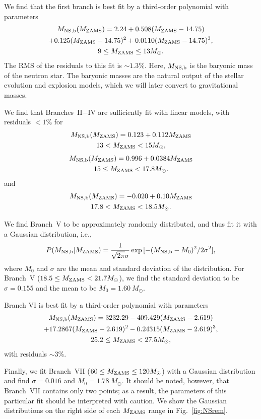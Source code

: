\documentclass[]{emulateapj}
\newcommand{\Ms}{M_{\odot}}
\newcommand{\Mz}{M_{\rm ZAMS}}
\newcommand{\Mnb}{M_{\rm NS, b}}
\begin{document}
We find that the first branch is best fit by a third-order polynomial with parameters
\begin{multline}
\Mnb(\Mz) = 2.24 + 0.508 (\Mz-14.75) \\ + 0.125 (\Mz-14.75)^2 + 0.0110(\Mz-14.75)^3, \\
9 \le \Mz \le 13 \Ms.
\end{multline} 
The RMS of the residuals to this fit is $\sim1.3\%$. Here, $\Mnb$ is the baryonic mass of the neutron star. The baryonic masses are the natural output of the stellar evolution and explosion models, which we will later convert to gravitational masses. 

We find that Branches~II$-$IV are sufficiently fit with linear models, with residuals $<1\%$ for
\begin{multline}
\Mnb(\Mz) = 0.123 + 0.112 \Mz\\
13 < \Mz < 15 \Ms,
\end{multline}
\begin{multline}
\Mnb(\Mz) = 0.996 + 0.0384 \Mz \\
15 \le \Mz < 17.8 \Ms.
\end{multline}
and
\begin{multline}
\Mnb(\Mz) = -0.020 + 0.10 \Mz \\
17.8 < \Mz  <18.5 \Ms.
\end{multline}

We find Branch~V to be approximately randomly distributed, and thus fit it with a Gaussian distribution, i.e.,
\begin{equation}
\label{eq:NSgauss}
P(\Mnb | \Mz) = \frac{1}{\sqrt{2 \pi} \sigma} \exp{[-(\Mnb - M_0)^2 / 2 \sigma^2]},
\end{equation}
where $M_0$ and $\sigma$ are the mean and standard deviation of the distribution.
For Branch~V ($18.5 \le \Mz  < 21.7 \Ms$), we find the standard deviation to be $\sigma = 0.155$ and the mean to be $M_0=1.60~\Ms$.

Branch VI is best fit by a third-order polynomial with parameters 
\begin{multline}
\Mnb(\Mz) = 3232.29 - 409.429(\Mz - 2.619) \\ 
	+ 17.2867 (\Mz-2.619)^2 - 0.24315(\Mz-2.619)^3, \\
25.2 \le \Mz < 27.5 \Ms,
\end{multline}
with residuals $\sim$3\%. 

Finally, we fit Branch~VII ($60 \le \Mz \le 120 \Ms$) with a Gaussian distribution and find $\sigma = 0.016$ and $M_0 = 1.78~\Ms$. It should be noted, however, that Branch~VII contains only two points; as a result, the parameters of this particular fit should be interpreted with caution. We show the Gaussian distributions on the right side of each $\Mz$ range in Fig.~\ref{fig:NSrem}.
\end{document}
